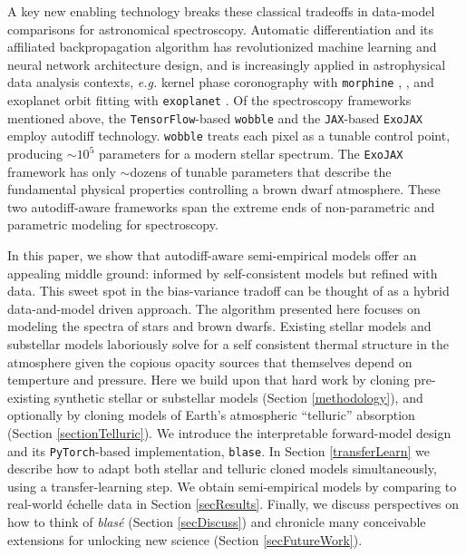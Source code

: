 \documentclass[trackchanges]{aastex631}
\begin{document}
A key new enabling technology breaks these classical tradeoffs in data-model comparisons for astronomical spectroscopy.  Automatic differentiation \citep[``autodiff'' or ``autograd'',][]{2015arXiv150205767G, 2016PhDT.......317M} and its affiliated backpropagation algorithm \citep{kelley1960,Linnainmaa1976TaylorEO, 1986Natur.323..533R, 1990JGCD...13..926D} has revolutionized machine learning and neural network architecture design, and is increasingly applied in astrophysical data analysis contexts, \emph{e.g.} kernel phase coronography with \texttt{morphine} \citep{2021ApJ...907...40P,2021JOSAB..38.2465W} , , and exoplanet orbit fitting with \texttt{exoplanet} \citep{2021JOSS....6.3285F}.  Of the spectroscopy frameworks mentioned above, the \texttt{TensorFlow}-based \citep{tensorflow2015-whitepaper} \texttt{wobble} and the \texttt{JAX}-based \citep{jax2018github} \texttt{ExoJAX} employ autodiff technology.  \texttt{wobble} treats each pixel as a tunable control point, producing $\sim10^5$ parameters for a modern stellar spectrum.  The \texttt{ExoJAX} framework has only $\sim$dozens of tunable parameters that describe the fundamental physical properties controlling a brown dwarf atmosphere.  These two autodiff-aware frameworks span the extreme ends of non-parametric and parametric modeling for spectroscopy.

In this paper, we show that autodiff-aware semi-empirical models offer an appealing middle ground: informed by self-consistent models but refined with data.  This sweet spot in the bias-variance tradoff can be thought of as a hybrid data-and-model driven approach.  The algorithm presented here focuses on modeling the spectra of stars and brown dwarfs.  Existing stellar models \citep[\emph{e.g.}][]{husser13} and substellar models \citep[\emph{e.g.}][]{2021ApJ...920...85M} laboriously solve for a self consistent thermal structure in the atmosphere given the copious opacity sources that themselves depend on temperture and pressure.  Here we build upon that hard work by cloning pre-existing synthetic stellar or substellar models (Section \ref{methodology}), and optionally by cloning models of Earth's atmospheric ``telluric'' absorption (Section \ref{sectionTelluric}). We introduce the interpretable forward-model design and its \texttt{PyTorch}-based \citep{2019arXiv191201703P} implementation, \texttt{blase}.  In Section \ref{transferLearn}  we describe how to adapt both stellar and telluric cloned models simultaneously, using a transfer-learning step.  We obtain semi-empirical models by comparing to real-world \'echelle data in Section \ref{secResults}. Finally, we discuss perspectives on how to think of \emph{blas\'e} (Section \ref{secDiscuss}) and chronicle many conceivable extensions for unlocking new science (Section \ref{secFutureWork}).
\end{document}
